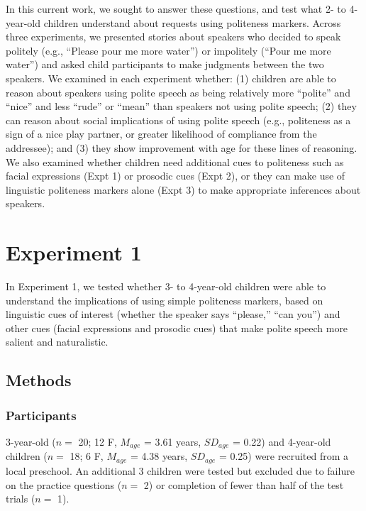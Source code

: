\documentclass[oneside]{report}
\begin{document}
In this current work, we sought to answer these questions, and test what
2- to 4-year-old children understand about requests using politeness
markers. Across three experiments, we presented stories about speakers
who decided to speak politely (e.g., ``Please pour me more water'') or
impolitely (``Pour me more water'') and asked child participants to make
judgments between the two speakers. We examined in each experiment
whether: (1) children are able to reason about speakers using polite
speech as being relatively more ``polite'' and ``nice'' and less
``rude'' or ``mean'' than speakers not using polite speech; (2) they can
reason about social implications of using polite speech (e.g.,
politeness as a sign of a nice play partner, or greater likelihood of
compliance from the addressee); and (3) they show improvement with age
for these lines of reasoning. We also examined whether children need
additional cues to politeness such as facial expressions (Expt 1) or
prosodic cues (Expt 2), or they can make use of linguistic politeness
markers alone (Expt 3) to make appropriate inferences about speakers.

\section{Experiment 1}\label{experiment-1}

In Experiment 1, we tested whether 3- to 4-year-old children were able
to understand the implications of using simple politeness markers, based
on linguistic cues of interest (whether the speaker says ``please,''
``can you'') and other cues (facial expressions and prosodic cues) that
make polite speech more salient and naturalistic.

\subsection{Methods}\label{methods}

\subsubsection{Participants}\label{participants}

3-year-old (\(n=\) 20; 12 F, \(M_{age}\) = 3.61 years, \(SD_{age}\) =
0.22) and 4-year-old children (\(n=\) 18; 6 F, \(M_{age}\) = 4.38 years,
\(SD_{age}\) = 0.25) were recruited from a local preschool. An
additional 3 children were tested but excluded due to failure on the
practice questions (\(n=\) 2) or completion of fewer than half of the
test trials (\(n=\) 1).
\end{document}
